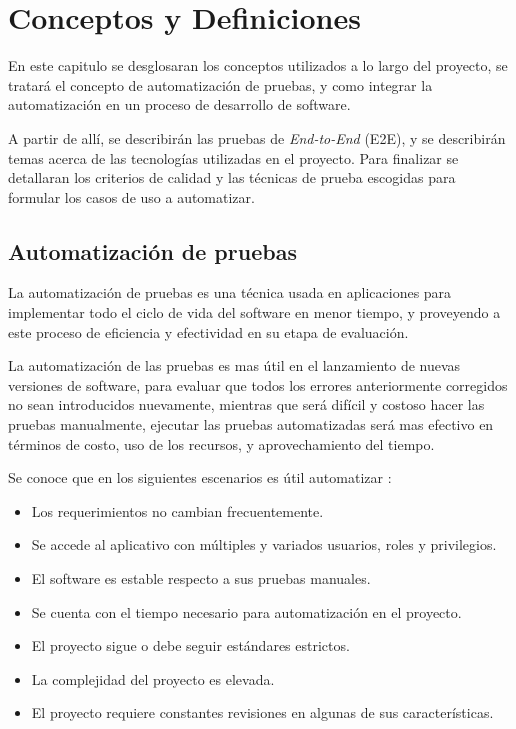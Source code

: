 \chapter{Conceptos y Definiciones}

En este capitulo se desglosaran los conceptos utilizados a lo largo del
proyecto, se tratará el concepto de automatización de pruebas, y como integrar
la automatización en un proceso de desarrollo de software.

A partir de allí, se describirán las pruebas de \emph{End-to-End} (E2E), y se
describirán temas acerca de las tecnologías utilizadas en el proyecto. Para
finalizar se detallaran los criterios de calidad y las técnicas de prueba
escogidas para formular los casos de uso a automatizar.

\section{Automatización de pruebas}
La automatización de pruebas es una técnica usada en aplicaciones para
implementar todo el ciclo de vida del software en menor tiempo, y proveyendo a
este proceso de eficiencia y efectividad en su etapa de evaluación.

La automatización de las pruebas es mas útil en el lanzamiento de nuevas
versiones de software, para evaluar que todos los errores anteriormente
corregidos no sean introducidos nuevamente, mientras que será difícil y costoso
hacer las pruebas manualmente, ejecutar las pruebas automatizadas será mas
efectivo en términos de costo, uso de los recursos, y aprovechamiento del
tiempo.

Se conoce que en los siguientes escenarios es útil automatizar \parencite{STC}:

\begin{itemize}
    \item Los requerimientos no cambian frecuentemente.
    \item Se accede al aplicativo con múltiples y variados usuarios, roles y
        privilegios.
    \item El software es estable respecto a sus pruebas manuales.
    \item Se cuenta con el tiempo necesario para automatización en el proyecto.
    \item El proyecto sigue o debe seguir estándares estrictos.
    \item La complejidad del proyecto es elevada.
    \item El proyecto requiere constantes revisiones en algunas de sus
    características.
\end{itemize}

